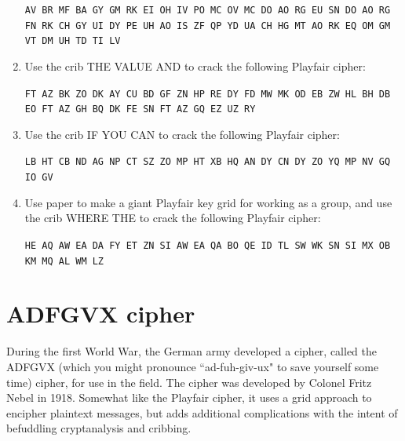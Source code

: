 \documentclass{book}
\theoremstyle{plain}
\theoremstyle{definition}
\newif\ifprintsolutions
\newcommand{\solution}[1]{\ifprintsolutions \begin{sloppypar}{\it #1}\end{sloppypar} \fi} %
\newcommand{\display}[1]{\begin{sloppypar}\setlength{\parindent}{0mm}#1\end{sloppypar}} %
\newcommand{\ciphertextspace}[1]{\begin{sloppypar}\doublespacing\Large\texttt{#1}\end{sloppypar}} %
\begin{document}
\begin{enumerate}
\display{\ciphertextspace{AV BR MF BA GY GM RK EI OH IV PO MC OV MC DO AO RG EU SN DO AO RG FN RK CH GY UI DY PE UH AO IS ZF QP YD UA CH HG MT AO RK EQ OM GM VT DM UH TD TI LV}} \solution{Keyword TIGER: to find a feeling that would hold, as their sum, as their final expression, the purpose of all the things she loved on earth}
\item Use the crib THE VALUE AND to crack the following Playfair cipher:
\display{\ciphertextspace{FT AZ BK ZO DK AY CU BD GF ZN HP RE DY FD MW MK OD EB ZW HL BH DB EO FT AZ GH BQ DK FE SN FT AZ GQ EZ UZ RY}} \solution{Keyword FIGHT: the value and veracity of such shall one day vindicate the vigilant and the virtuous}
\item Use the crib IF YOU CAN to crack the following Playfair cipher:
\display{\ciphertextspace{LB HT CB ND AG NP CT SZ ZO MP HT XB HQ AN DY CN DY ZO YQ MP NV GQ IO GV}} \solution{Keyword CANDY: If you can read this, you get candy and that is awesome.}
\item Use paper to make a giant Playfair key grid for working as a group, and use the crib WHERE THE to crack the following Playfair cipher:
\display{\ciphertextspace{HE AQ AW EA DA FY ET ZN SI AW EA QA BO QE ID TL SW WK SN SI MX OB KM MQ AL WM LZ}} \solution{Keyword WHEAT: Where the fear has gone, there will be nothing; only I will remain.}
\end{enumerate}

\chapter{ADFGVX cipher}
During the first World War, the German army developed a cipher, called the ADFGVX (which you might pronounce ``ad-fuh-giv-ux" to save yourself some time) cipher, for use in the field. The cipher was developed by Colonel Fritz Nebel in 1918. Somewhat like the Playfair cipher, it uses a grid approach to encipher plaintext messages, but adds additional complications with the intent of befuddling cryptanalysis and cribbing.
\end{document}
